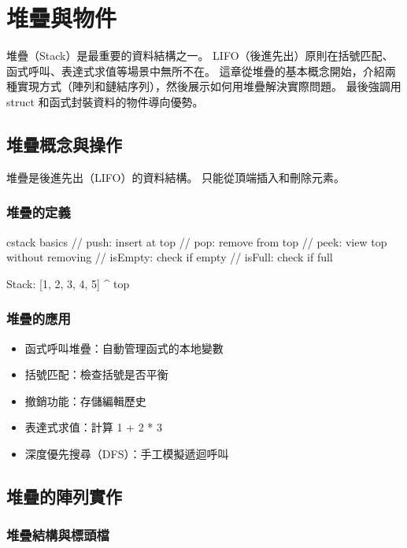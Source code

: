 \chapter{堆疊與物件}

堆疊（Stack）是最重要的資料結構之一。 LIFO（後進先出）原則在括號匹配、函式呼叫、表達式求值等場景中無所不在。 這章從堆疊的基本概念開始，介紹兩種實現方式（陣列和鏈結序列），然後展示如何用堆疊解決實際問題。 最後強調用 struct 和函式封裝資料的物件導向優勢。

\section{堆疊概念與操作}

堆疊是後進先出（LIFO）的資料結構。 只能從頂端插入和刪除元素。

\subsection*{堆疊的定義}

\begin{code}{c}{stack basics}
// push: insert at top
// pop: remove from top
// peek: view top without removing
// isEmpty: check if empty
// isFull: check if full

Stack: [1, 2, 3, 4, 5]
              ^
              top
\end{code}

\subsection*{堆疊的應用}

\begin{itemize}
\item 函式呼叫堆疊：自動管理函式的本地變數
\item 括號匹配：檢查括號是否平衡
\item 撤銷功能：存儲編輯歷史
\item 表達式求值：計算 1 + 2 * 3
\item 深度優先搜尋（DFS）：手工模擬遞迴呼叫
\end{itemize}


\section{堆疊的陣列實作}

\subsection*{堆疊結構與標頭檔}

